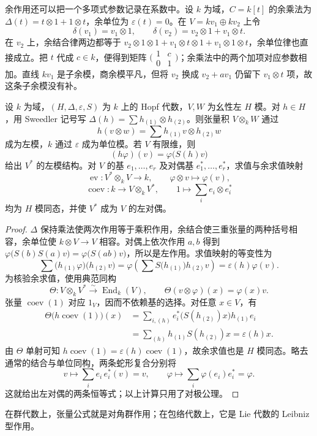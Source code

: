 \ProseParagraphBreak
余作用还可以把一个多项式参数记录在系数中。设 \(k\) 为域，\(C=k[t]\) 的余乘法为 \(\Delta(t)=t\otimes1+1\otimes t\)，余单位为 \(\varepsilon(t)=0\)。在 \(V=kv_1\oplus kv_2\) 上令
\[
	\delta(v_1)=v_1\otimes1,\qquad \delta(v_2)=v_2\otimes1+v_1\otimes t.
\]
在 \(v_2\) 上，余结合律两边都等于 \(v_2\otimes1\otimes1+v_1\otimes t\otimes1+v_1\otimes1\otimes t\)，余单位律也直接成立。把 \(t\) 代成 \(c\in k\)，便得到矩阵
\(\bigl(\begin{smallmatrix}1&c\\0&1\end{smallmatrix}\bigr)\)；余乘法中的两个加项对应参数相加。直线 \(kv_1\) 是子余模，商余模平凡，但将 \(v_2\) 换成 \(v_2+av_1\) 仍留下 \(v_1\otimes t\) 项，故这条子余模没有补。

\begin{proposition}\label{b5:prop:hopf-tensor-dual}
	设 \(k\) 为域，\((H,\Delta,\varepsilon,S)\) 为 \(k\) 上的 Hopf 代数，\(V,W\) 为幺性左 \(H\) 模。对 \(h\in H\)，用 Sweedler 记号写 \(\Delta(h)=\sum h_{(1)}\otimes h_{(2)}\)。则张量积 \(V\otimes_kW\) 通过
	\[
		h(v\otimes w)=\sum h_{(1)}v\otimes h_{(2)}w
	\]
	成为左模，\(k\) 通过 \(\varepsilon\) 成为单位模。若 \(V\) 有限维，则
	\[
		(h\varphi)(v)=\varphi\bigl(S(h)v\bigr)
	\]
	给出 \(V^*\) 的左模结构。对 \(V\) 的基 \(e_1,\ldots,e_r\) 及对偶基 \(e_1^*,\ldots,e_r^*\)，求值与余求值映射
	\[
		\operatorname{ev}:V^*\otimes_kV\to k,\qquad \varphi\otimes v\mapsto\varphi(v),
	\]
	\[
		\operatorname{coev}:k\to V\otimes_kV^*,\qquad 1\mapsto\sum_i e_i\otimes e_i^*
	\]
	均为 \(H\) 模同态，并使 \(V^*\) 成为 \(V\) 的左对偶。
\end{proposition}
\begin{proof}
	\(\Delta\) 保持乘法使两次作用等于乘积作用，余结合使三重张量的两种括号相容，余单位使 \(k\otimes V\to V\) 相容。对偶上依次作用 \(a,b\) 得到 \(\varphi\bigl(S(b)S(a)v\bigr)=\varphi\bigl(S(ab)v\bigr)\)，所以是左作用。求值映射的等变性为
	\[
		\sum\bigl(h_{(1)}\varphi\bigr)\bigl(h_{(2)}v\bigr) =\varphi\left(\sum S\bigl(h_{(1)}\bigr)h_{(2)}v\right) =\varepsilon(h)\varphi(v).
	\]
	为核验余求值，使用典范同构
	\[
		\Theta:V\otimes_kV^*\xrightarrow{\sim}\operatorname{End}_k(V),\qquad \Theta(v\otimes\varphi)(x)=\varphi(x)v.
	\]
	张量 \(\operatorname{coev}(1)\) 对应 \(1_V\)，因而不依赖基的选择。对任意 \(x\in V\)，有
	\[
		\begin{aligned}
			\Theta\bigl(h\operatorname{coev}(1)\bigr)(x) &=\sum_{i,(h)} e_i^*\bigl(S(h_{(2)})x\bigr)h_{(1)}e_i\\
			&=\sum_{(h)}h_{(1)}S(h_{(2)})x =\varepsilon(h)x.
		\end{aligned}
	\]
	由 \(\Theta\) 单射可知 \(h\operatorname{coev}(1)=\varepsilon(h)\operatorname{coev}(1)\)，故余求值也是 \(H\) 模同态。略去通常的结合与单位同构，两条蛇形复合分别将
	\[
		v\longmapsto\sum_i e_i\,e_i^*(v)=v,\qquad \varphi\longmapsto\sum_i\varphi(e_i)e_i^*=\varphi.
	\]
	这就给出左对偶的两条恒等式；以上计算只用了对极公理。
\end{proof}
在群代数上，张量公式就是对角群作用；在包络代数上，它是 Lie 代数的 Leibniz 型作用。

